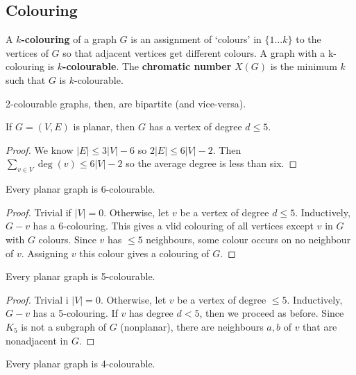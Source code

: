 \documentclass[12pt]{article}
\begin{document}
\subsection{Colouring}
A {\bf $k$-colouring} of a graph $G$ is an assignment of `colours' in $\{1\dots k\}$ to the vertices of $G$ so that adjacent vertices get different colours. A graph with a k-colouring is {\bf $k$-colourable}. The {\bf chromatic number} $X(G)$ is the minimum $k$ such that $G$ is $k$-colourable.

2-colourable graphs, then, are bipartite (and vice-versa).

\begin{lemma}
If $G = (V,E)$ is planar, then $G$ has a vertex of degree $d \leq 5$.
\end{lemma}

\begin{proof}
We know $|E| \leq 3|V| - 6$ so $2|E| \leq 6|V| - 2$. Then $\displaystyle\sum_{v\in V} \deg(v) \leq 6|V| - 2$ so the average degree is less than six.
\end{proof}

\begin{theorem}
Every planar graph is 6-colourable.
\end{theorem}

\begin{proof}
Trivial if $|V| = 0$. Otherwise, let $v$ be a vertex of degree $d \leq 5$. Inductively, $G-v$ has a $6$-colouring. This gives a vlid colouring of all vertices except $v$ in $G$ with $G$ colours. Since $v$ has $\leq 5$ neighbours, some colour occurs on no neighbour of $v$. Assigning $v$ this colour gives a colouring of $G$.
\end{proof}

\begin{theorem}
Every planar graph is 5-colourable.
\end{theorem}

\begin{proof}
Trivial i $|V| = 0$. Otherwise, let $v$ be a vertex of degree $\leq 5$. Inductively, $G-v$ has a 5-colouring. If $v$ has degree $d < 5$, then we proceed as before. Since $K_5$ is not a subgraph of $G$ (nonplanar), there are neighbours $a,b$ of $v$ that are nonadjacent in $G$.
\end{proof}

\begin{theorem}
Every planar graph is 4-colourable.
\end{theorem}
\end{document}

